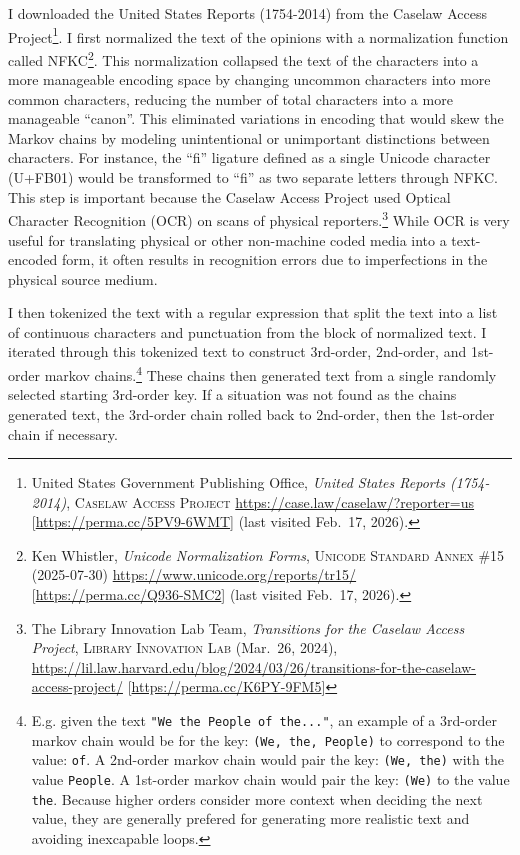 \documentclass[
]{article}
\begin{document}
I downloaded the United States Reports (1754-2014) from the Caselaw Access Project\footnote{United States Government Publishing Office, \emph{United States Reports (1754-2014)}, \textsc{Caselaw Access Project} \url{https://case.law/caselaw/?reporter=us} {[}\url{https://perma.cc/5PV9-6WMT}{]} (last visited Feb.~17, 2026).}. I first normalized the text of the opinions with a normalization function called NFKC\footnote{Ken Whistler, \emph{Unicode Normalization Forms}, \textsc{Unicode Standard Annex \#15} (2025-07-30) \url{https://www.unicode.org/reports/tr15/} {[}\url{https://perma.cc/Q936-SMC2}{]} (last visited Feb.~17, 2026).}. This normalization collapsed the text of the characters into a more manageable encoding space by changing uncommon characters into more common characters, reducing the number of total characters into a more manageable ``canon''. This eliminated variations in encoding that would skew the Markov chains by modeling unintentional or unimportant distinctions between characters. For instance, the ``ﬁ'' ligature defined as a single Unicode character (U+FB01) would be transformed to ``fi'' as two separate letters through NFKC. This step is important because the Caselaw Access Project used Optical Character Recognition (OCR) on scans of physical reporters.\footnote{The Library Innovation Lab Team, \emph{Transitions for the Caselaw Access Project}, \textsc{Library Innovation Lab} (Mar.~26, 2024), \url{https://lil.law.harvard.edu/blog/2024/03/26/transitions-for-the-caselaw-access-project/} {[}\url{https://perma.cc/K6PY-9FM5}{]}} While OCR is very useful for translating physical or other non-machine coded media into a text-encoded form, it often results in recognition errors due to imperfections in the physical source medium.

I then tokenized the text with a regular expression that split the text into a list of continuous characters and punctuation from the block of normalized text. I iterated through this tokenized text to construct 3rd-order, 2nd-order, and 1st-order markov chains.\footnote{E.g. given the text \texttt{"We\ the\ People\ of\ the..."}, an example of a 3rd-order markov chain would be for the key: \texttt{(\textquotesingle{}We\textquotesingle{},\ \textquotesingle{}the\textquotesingle{},\ \textquotesingle{}People)} to correspond to the value: \texttt{\textquotesingle{}of\textquotesingle{}}. A 2nd-order markov chain would pair the key: \texttt{(\textquotesingle{}We\textquotesingle{},\ \textquotesingle{}the\textquotesingle{})} with the value \texttt{\textquotesingle{}People\textquotesingle{}}. A 1st-order markov chain would pair the key: \texttt{(\textquotesingle{}We\textquotesingle{})} to the value \texttt{\textquotesingle{}the\textquotesingle{}}. Because higher orders consider more context when deciding the next value, they are generally prefered for generating more realistic text and avoiding inexcapable loops.} These chains then generated text from a single randomly selected starting 3rd-order key. If a situation was not found as the chains generated text, the 3rd-order chain rolled back to 2nd-order, then the 1st-order chain if necessary.
\end{document}
